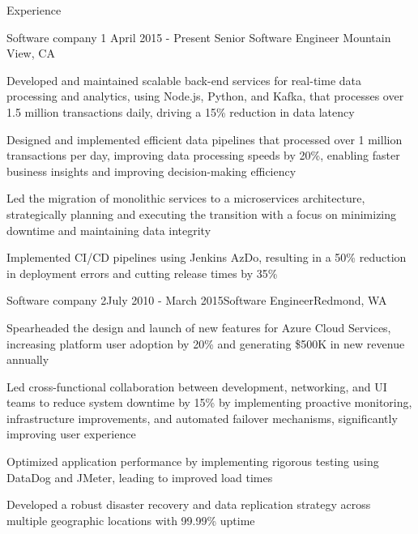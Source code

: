 \documentclass[
	11pt, %
]{resume} %
\begin{document}

\begin{rSection}{Experience}

	\begin{rSubsection}{Software company 1} {April 2015 - Present} {Senior Software Engineer} {Mountain View, CA}
		\item Developed and maintained scalable back-end services for real-time data processing and analytics, using Node.js, Python, and Kafka, that processes over 1.5 million transactions daily, driving a 15\% reduction in data latency
		\item Designed and implemented efficient data pipelines that processed over 1 million transactions per day, improving data processing speeds by 20\%, enabling faster business insights and improving decision-making efficiency
		\item Led the migration of monolithic services to a microservices architecture, strategically planning and executing the transition with a focus on minimizing downtime and maintaining data integrity
		\item Implemented CI/CD pipelines using Jenkins AzDo, resulting in a 50\% reduction in deployment errors and cutting release times by 35\%
	\end{rSubsection}

	\begin{rSubsection}{Software company 2}{July 2010 - March 2015}{Software Engineer}{Redmond, WA}
		\item Spearheaded the design and launch of new features for Azure Cloud Services, increasing platform user adoption by 20\% and generating \$500K in new revenue annually
		\item Led cross-functional collaboration between development, networking, and UI teams to reduce system downtime by 15\% by implementing proactive monitoring, infrastructure improvements, and automated failover mechanisms, significantly improving user experience
		\item Optimized application performance by implementing rigorous testing using DataDog and JMeter, leading to improved load times
		\item Developed a robust disaster recovery and data replication strategy across multiple geographic locations with 99.99\% uptime
	\end{rSubsection}


\end{rSection}
\end{document}
